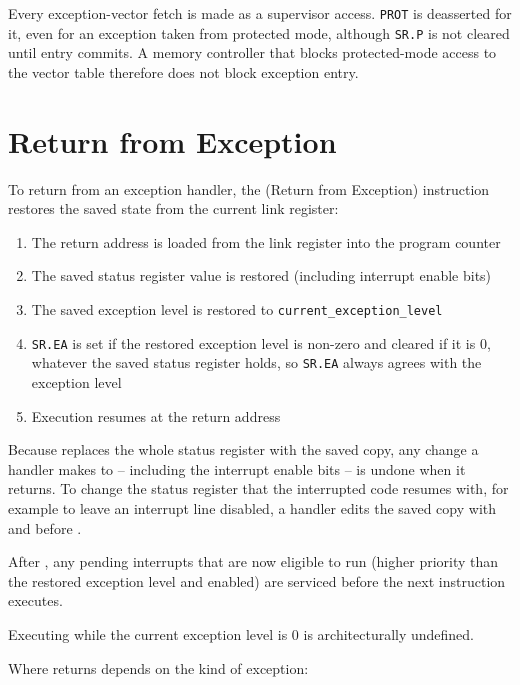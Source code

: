 Every exception-vector fetch is made as a supervisor access. \texttt{PROT} is deasserted for it, even for an exception
taken from protected mode, although \texttt{SR.P} is not cleared until entry commits. A memory controller that blocks
protected-mode access to the vector table therefore does not block exception entry.

\section{Return from Exception}
\label{sec:return-from-exception}

To return from an exception handler, the  (Return from Exception) instruction restores the saved state
from the current link register:

\begin{enumerate}
	\item The return address is loaded from the link register into the program counter
	\item The saved status register value is restored (including interrupt enable bits)
	\item The saved exception level is restored to \texttt{current\_exception\_level}
	\item \texttt{SR.EA} is set if the restored exception level is non-zero and cleared if it is 0, whatever the saved status
	      register holds, so \texttt{SR.EA} always agrees with the exception level
	\item Execution resumes at the return address
\end{enumerate}

Because  replaces the whole status register with the saved copy, any change a handler makes to 
-- including the interrupt enable bits -- is undone when it returns. To change the status register that the interrupted
code resumes with, for example to leave an interrupt line disabled, a handler edits the saved copy with 
and  before .

After , any pending interrupts that are now eligible to run (higher priority than the restored exception
level and enabled) are serviced before the next instruction executes.

Executing  while the current exception level is 0 is architecturally undefined.

Where  returns depends on the kind of exception:

